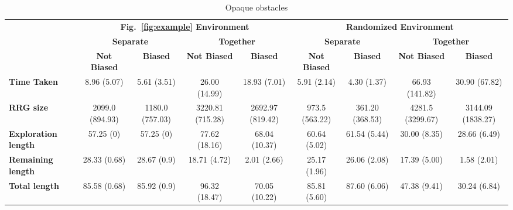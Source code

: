 \begin{table*}[]
    \centering
    \caption{Opaque obstacles}
    \label{tab:my_label2}
    \setlength{\tabcolsep}{3pt}
    \scriptsize
    \begin{tabular}{l c c c c c c c c }
        \toprule
        \textbf{} & \multicolumn{4}{c}{\textbf{Fig.~\ref{fig:example} Environment}} & \multicolumn{4}{c}{\textbf{Randomized Environment}} \\
        \cmidrule(lr{.75em}){2-5} \cmidrule(l{.75em}r){6-9}
		\textbf{} & \multicolumn{2}{c}{\textbf{Separate}} & \multicolumn{2}{c}{\textbf{Together}} &
		            \multicolumn{2}{c}{\textbf{Separate}} & \multicolumn{2}{c}{\textbf{Together}}\\
		\cmidrule(lr{.75em}){2-3} \cmidrule(l{.75em}r){4-5} \cmidrule(lr{.75em}){6-7} \cmidrule(l{.75em}r){8-9}
		\textbf{} & \textbf{Not Biased} & \textbf{Biased} & \textbf{Not Biased} & \textbf{Biased} & 
		            \textbf{Not Biased} & \textbf{Biased} & \textbf{Not Biased} & \textbf{Biased}\\
		\midrule
		\textbf{Time Taken}       & 8.96 (5.07) & 5.61 (3.51) & 26.00 (14.99) & 18.93 (7.01) & 
		                            5.91 (2.14) & 4.30 (1.37) & 66.93 (141.82) & 30.90 (67.82)\\
		\textbf{RRG size}         &2099.0 (894.93) & 1180.0 (757.03) & 3220.81 (715.28) & 2692.97 (819.42)&
		                           973.5 (563.22) & 361.20 (368.53) & 4281.5 (3299.67) & 3144.09 (1838.27)\\
		\textbf{Exploration length}  & 57.25 (0)    & 57.25 (0)   & 77.62 (18.16) & 68.04 (10.37) & 
		                            60.64 (5.02) & 61.54 (5.44) & 30.00 (8.35) & 28.66 (6.49)\\
		\textbf{Remaining length} & 28.33 (0.68) & 28.67 (0.9) & 18.71 (4.72) & 2.01 (2.66) & 
		                            25.17 (1.96) & 26.06 (2.08) & 17.39 (5.00) & 1.58 (2.01)\\
		\textbf{Total length}     & 85.58 (0.68) & 85.92 (0.9) & 96.32 (18.47) & 70.05 (10.22) & 
		                            85.81 (5.60) & 87.60 (6.06) & 47.38 (9.41) & 30.24 (6.84)\\
		\bottomrule
    \end{tabular}
\end{table*}


